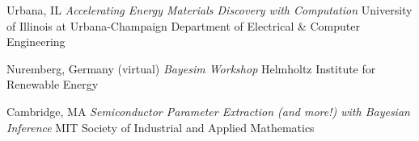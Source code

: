 \vspace{\talksep}
\datedsubsection{}
    {Urbana, IL}
    {\textit{Accelerating Energy Materials Discovery with Computation}}
    {University of Illinois at Urbana-Champaign Department of Electrical \& Computer Engineering}

\vspace{\talkyearsep}
    {Nuremberg, Germany (virtual)}
    {\textit{Bayesim Workshop}}
    {Helmholtz Institute for Renewable Energy}

\vspace{\talksep}
    {Cambridge, MA}
    {\textit{Semiconductor Parameter Extraction (and more!) with Bayesian Inference}}
    {MIT Society of Industrial and Applied Mathematics}
